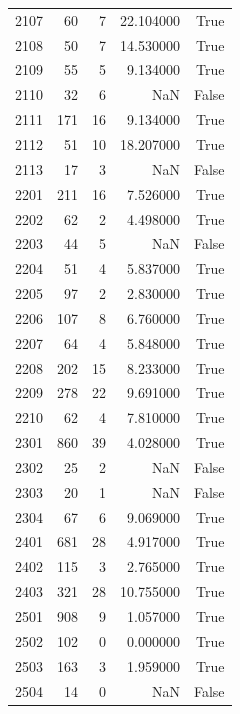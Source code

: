 \begin{longtable}{lrrrr}
2107 & 60 & 7 & 22.104000 & True \\
2108 & 50 & 7 & 14.530000 & True \\
2109 & 55 & 5 & 9.134000 & True \\
2110 & 32 & 6 & NaN & False \\
2111 & 171 & 16 & 9.134000 & True \\
2112 & 51 & 10 & 18.207000 & True \\
2113 & 17 & 3 & NaN & False \\
2201 & 211 & 16 & 7.526000 & True \\
2202 & 62 & 2 & 4.498000 & True \\
2203 & 44 & 5 & NaN & False \\
2204 & 51 & 4 & 5.837000 & True \\
2205 & 97 & 2 & 2.830000 & True \\
2206 & 107 & 8 & 6.760000 & True \\
2207 & 64 & 4 & 5.848000 & True \\
2208 & 202 & 15 & 8.233000 & True \\
2209 & 278 & 22 & 9.691000 & True \\
2210 & 62 & 4 & 7.810000 & True \\
2301 & 860 & 39 & 4.028000 & True \\
2302 & 25 & 2 & NaN & False \\
2303 & 20 & 1 & NaN & False \\
2304 & 67 & 6 & 9.069000 & True \\
2401 & 681 & 28 & 4.917000 & True \\
2402 & 115 & 3 & 2.765000 & True \\
2403 & 321 & 28 & 10.755000 & True \\
2501 & 908 & 9 & 1.057000 & True \\
2502 & 102 & 0 & 0.000000 & True \\
2503 & 163 & 3 & 1.959000 & True \\
2504 & 14 & 0 & NaN & False \\
\end{longtable}
